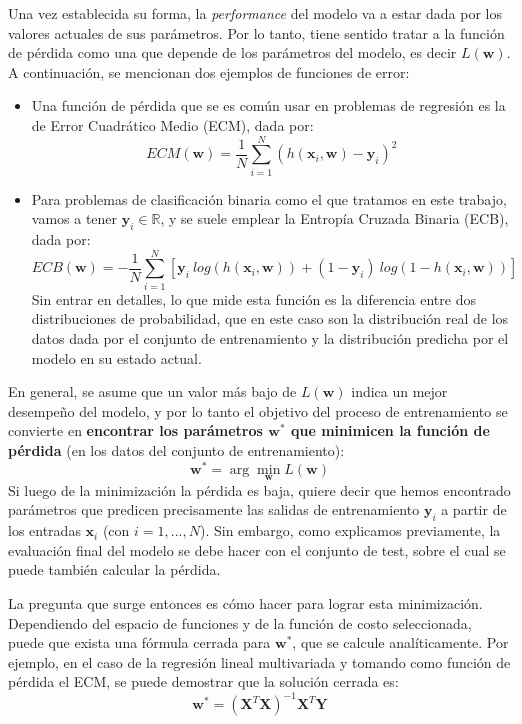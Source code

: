 \documentclass[../../main.tex]{subfiles}
\begin{document}
Una vez establecida su forma, la \textit{performance} del modelo va a estar dada por los
valores actuales de sus parámetros. Por lo tanto, tiene sentido tratar a la función de
pérdida como una que depende de los parámetros del modelo, es decir
\(L(\bm{w})\)\footnotemark.  A continuación, se
mencionan dos ejemplos de funciones de error:
\begin{itemize}
    \item Una función de pérdida que se es común usar en problemas de regresión es la de
    Error Cuadrático Medio (ECM), dada por:
    \[
    ECM(\bm{w}) = \frac{1}{N} \sum_{i=1}^{N} \left(h(\mathbf{x}_i, \bm{w}) - \mathbf{y}_i\right)^2
    \]
    \item Para problemas de clasificación binaria como el que tratamos en este trabajo, vamos a tener
    \(\mathbf{y}_i \in \mathbb{R}\), y se suele emplear la Entropía Cruzada Binaria (ECB), dada por:
    \[
    ECB(\bm{w}) = -\frac{1}{N} \sum_{i=1}^{N}
        \left[
            \mathbf{y}_i\ log(h(\mathbf{x}_i, \bm{w})) + (1 - \mathbf{y}_i)\ log(1 - h(\mathbf{x}_i, \bm{w}))
        \right]
    \]
    Sin entrar en detalles, lo que mide esta función es la diferencia entre dos
    distribuciones de probabilidad, que en este caso son la distribución real de los datos
    dada por el conjunto de entrenamiento y la distribución predicha por el modelo en su
    estado actual.
\end{itemize}

En general, se asume que un valor más bajo de \(L(\bm{w})\) indica un mejor desempeño del
modelo, y por lo tanto el objetivo del proceso de entrenamiento se convierte en
\textbf{encontrar los parámetros \(\bm{w}^*\) que minimicen la función de pérdida}
(en los datos del conjunto de entrenamiento):
\[
\bm{w}^* = \arg\min_{\bm{w}} L(\bm{w})
\]
Si luego de la minimización la pérdida es baja, quiere decir que hemos encontrado
parámetros que predicen precisamente las salidas de entrenamiento \(\mathbf{y}_i\) a partir de los
entradas \(\mathbf{x}_i\) (con \(i=1,...,N\)). Sin embargo, como explicamos previamente, la
evaluación final del modelo se debe hacer con el conjunto de test, sobre el cual se puede
también calcular la pérdida.

La pregunta que surge entonces es cómo hacer para lograr esta minimización. Dependiendo
del espacio de funciones y de la función de costo seleccionada, puede que exista una
fórmula cerrada para \(\bm{w}^*\), que se calcule analíticamente. Por ejemplo, en el
caso de la regresión lineal multivariada y tomando como función de pérdida el ECM, se
puede demostrar que la solución cerrada es:
\[
    \bm{w}^* = \left(\mathbf{X}^T \mathbf{X}\right)^{-1} \mathbf{X}^T \mathbf{Y}
\]
\end{document}
